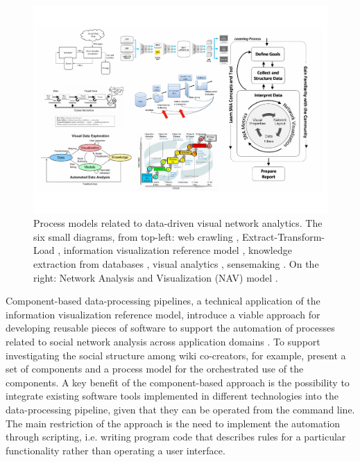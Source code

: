 \begin{figure}[htb]
\centering
\includegraphics[width=14cm]{figure/Process-models-collage.pdf}
\caption{Process models related to data-driven visual network analytics. The six small diagrams, from top-left: 
web crawling \citep{Wikipedia.org2015}, 
Extract-Transform-Load \citep{Intel2013}, 
information visualization reference model \citep{Card1999ReadingsThink}, 
knowledge extraction from databases \citep{Indarto2013}, 
visual analytics \citep{Keim2010MasteringAnalytics}, 
sensemaking \citep{Pirolli2005TheAnalysis}. 
On the right: Network Analysis and Visualization (NAV) model \citep{Hansen2012DoData}.}
\label{fig:process-model-collage}
\end{figure}

Component-based data-processing pipelines, a technical application of the information visualization reference model, introduce a viable approach for developing reusable pieces of software to support the automation of processes related to social network analysis across application domains \citep{Nykanen2008,Huhtamaki2010Context-DrivenCo-Creation}. To support investigating the social structure among wiki co-creators, for example, \cite{Huhtamaki2010Context-DrivenCo-Creation} present a set of components and a process model for the orchestrated use of the components. A key benefit of the component-based approach \citep{Nykanen2008} is the possibility to integrate existing software tools implemented in different technologies into the data-processing pipeline, given that they can be operated from the command line. The main restriction of the approach is the need to implement the automation through scripting, i.e. writing program code that describes rules for a particular functionality rather than operating a user interface.

